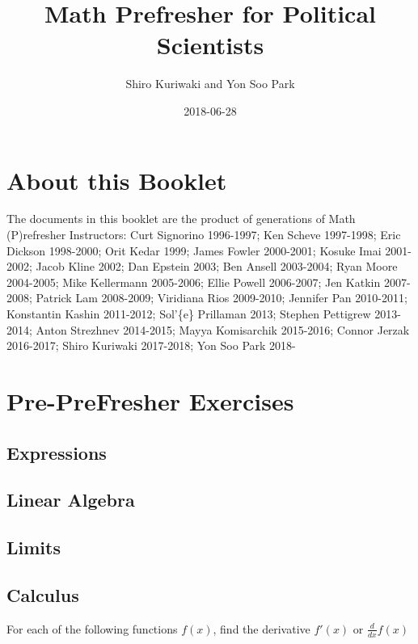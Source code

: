\documentclass[]{book}
\title{Math Prefresher for Political Scientists}
\author{Shiro Kuriwaki and Yon Soo Park}
\date{2018-06-28}
\theoremstyle{definition}
\theoremstyle{definition}
\theoremstyle{definition}
\theoremstyle{remark}
\begin{document}
\maketitle

{
\setcounter{tocdepth}{1}
\tableofcontents
}
\chapter*{About this Booklet}\label{about-this-booklet}

The documents in this booklet are the product of generations of Math
(P)refresher Instructors: Curt Signorino 1996-1997; Ken Scheve
1997-1998; Eric Dickson 1998-2000; Orit Kedar 1999; James Fowler
2000-2001; Kosuke Imai 2001-2002; Jacob Kline 2002; Dan Epstein 2003;
Ben Ansell 2003-2004; Ryan Moore 2004-2005; Mike Kellermann 2005-2006;
Ellie Powell 2006-2007; Jen Katkin 2007-2008; Patrick Lam 2008-2009;
Viridiana Rios 2009-2010; Jennifer Pan 2010-2011; Konstantin Kashin
2011-2012; Sol'\{e\} Prillaman 2013; Stephen Pettigrew 2013-2014; Anton
Strezhnev 2014-2015; Mayya Komisarchik 2015-2016; Connor Jerzak
2016-2017; Shiro Kuriwaki 2017-2018; Yon Soo Park 2018-

\chapter{Pre-PreFresher Exercises}\label{pre-prefresher-exercises}

\section{Expressions}\label{expressions}

\section{Linear Algebra}\label{linear-algebra}

\section{Limits}\label{limits}

\section{Calculus}\label{calculus}

For each of the following functions \(f(x)\), find the derivative
\(f'(x)\) or \(\frac{d}{dx}f(x)\)
\end{document}
